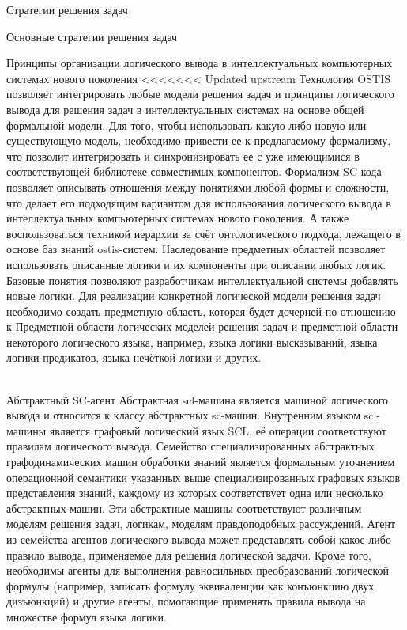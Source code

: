 \begin{frame}{Стратегии решения задач}
\begin{frame}{\large Основные стратегии решения задач}
\begin{textitemize}
\begin{frame}{\large Принципы организации логического вывода в интеллектуальных компьютерных системах нового поколения}
<<<<<<< Updated upstream
    \vspace{15mm}
        Технология OSTIS позволяет интегрировать любые модели решения задач и принципы логического вывода для решения задач в интеллектуальных системах на основе общей формальной модели. Для того, чтобы использовать какую-либо новую или существующую модель, необходимо привести ее к предлагаемому формализму, что позволит интегрировать и синхронизировать ее с уже имеющимися в соответствующей библиотеке совместимых компонентов. Формализм SC-кода позволяет описывать отношения между понятиями любой формы и сложности, что делает его подходящим вариантом для использования логического вывода в интеллектуальных компьютерных системах нового поколения. А также воспользоваться техникой иерархии за счёт онтологического подхода, лежащего в основе баз знаний ostis-систем.
        Наследование предметных областей позволяет использовать описанные логики и их компоненты при описании любых логик. Базовые понятия позволяют разработчикам интеллектуальной системы добавлять новые логики. Для реализации конкретной логической модели решения задач необходимо создать предметную область, которая будет дочерней по отношению к Предметной области логических моделей решения задач и предметной области некоторого логического языка, например, языка логики высказываний, языка логики предикатов, языка нечёткой логики и других.
\end{frame}

\begin{frame}{\\Абстрактный SC-агент}
\vspace{12mm}
Абстрактная scl-машина является машиной логического вывода и относится к классу абстрактных sc-машин. Внутренним языком scl-машины является графовый логический язык SCL, её операции соответствуют правилам логического вывода. Семейство специализированных абстрактных графодинамических машин обработки знаний является формальным уточнением операционной семантики указанных выше специализированных графовых языков представления знаний, каждому из которых соответствует одна или несколько абстрактных машин. Эти абстрактные машины соответствуют различным моделям решения задач, логикам, моделям правдоподобных рассуждений. Агент из семейства агентов логического вывода может представлять собой какое-либо правило вывода, применяемое для решения логической задачи. Кроме того, необходимы агенты для выполнения равносильных преобразований логической формулы (например, записать формулу эквиваленции как конъюнкцию двух дизъюнкций) и другие агенты, помогающие применять правила вывода на множестве формул языка логики.
\end{frame}


\end{textitemize}
\end{frame}
\end{frame}
